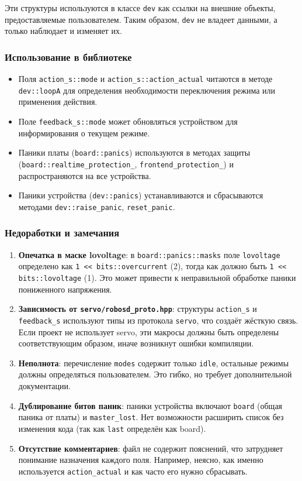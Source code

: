 \documentclass[a4paper,12pt]{article}
\begin{document}
Эти структуры используются в классе \texttt{dev} как ссылки на внешние объекты, предоставляемые пользователем. Таким образом, \texttt{dev} не владеет данными, а только наблюдает и изменяет их.

\subsubsection{Использование в библиотеке}

\begin{itemize}
    \item Поля \texttt{action\_s::mode} и \texttt{action\_s::action\_actual} читаются в методе \texttt{dev::loopA} для определения необходимости переключения режима или применения действия.
    \item Поле \texttt{feedback\_s::mode} может обновляться устройством для информирования о текущем режиме.
    \item Паники платы (\texttt{board::panics}) используются в методах защиты (\texttt{board::realtime\_protection\_}, \texttt{frontend\_protection\_}) и распространяются на все устройства.
    \item Паники устройства (\texttt{dev::panics}) устанавливаются и сбрасываются методами \texttt{dev::raise\_panic}, \texttt{reset\_panic}.
\end{itemize}

\subsubsection{Недоработки и замечания}

\begin{enumerate}
    \item \textbf{Опечатка в маске lovoltage}: в \texttt{board::panics::masks} поле \texttt{lovoltage} определено как \texttt{1 << bits::overcurrent} (2), тогда как должно быть \texttt{1 << bits::lovoltage} (1). Это может привести к неправильной обработке паники пониженного напряжения.
    \item \textbf{Зависимость от \texttt{servo/robosd\_proto.hpp}}: структуры \texttt{action\_s} и \texttt{feedback\_s} используют типы из протокола \texttt{servo}, что создаёт жёсткую связь. Если проект не использует servo, эти макросы должны быть определены соответствующим образом, иначе возникнут ошибки компиляции.
    \item \textbf{Неполнота}: перечисление \texttt{modes} содержит только \texttt{idle}, остальные режимы должны определяться пользователем. Это гибко, но требует дополнительной документации.
    \item \textbf{Дублирование битов паник}: паники устройства включают \texttt{board} (общая паника от платы) и \texttt{master\_lost}. Нет возможности расширить список без изменения кода (так как \texttt{last} определён как board).
    \item \textbf{Отсутствие комментариев}: файл не содержит пояснений, что затрудняет понимание назначения каждого поля. Например, неясно, как именно используется \texttt{action\_actual} и как часто его нужно сбрасывать.
\end{enumerate}
\end{document}
